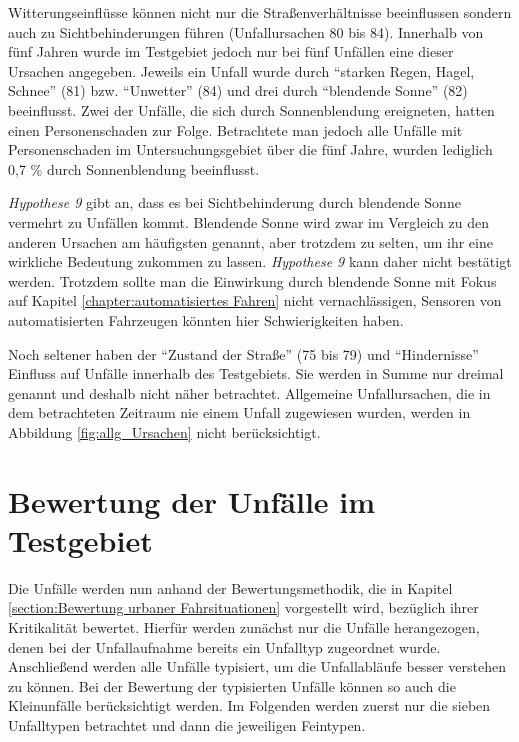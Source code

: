 Witterungseinflüsse können nicht nur die Straßenverhältnisse beeinflussen sondern auch zu Sichtbehinderungen führen (Unfallursachen 80 bis 84). Innerhalb von fünf Jahren wurde im Testgebiet jedoch nur bei fünf Unfällen eine dieser Ursachen angegeben. Jeweils ein Unfall wurde durch \enquote{starken Regen, Hagel, Schnee} (81) bzw. \enquote{Unwetter} (84) und drei durch \enquote{blendende Sonne} (82) beeinflusst. Zwei der Unfälle, die sich durch Sonnenblendung ereigneten, hatten einen Personenschaden zur Folge. Betrachtete man jedoch alle Unfälle mit Personenschaden im Untersuchungsgebiet über die fünf Jahre, wurden lediglich 0,7 \% durch Sonnenblendung beeinflusst.

\textit{Hypothese 9} gibt an, dass es bei Sichtbehinderung durch blendende Sonne vermehrt zu Unfällen kommt. Blendende Sonne wird zwar im Vergleich zu den anderen Ursachen am häufigsten genannt, aber trotzdem zu selten, um ihr eine wirkliche Bedeutung zukommen zu lassen. \textit{Hypothese 9} kann daher nicht bestätigt werden. Trotzdem sollte man die Einwirkung durch blendende Sonne mit Fokus auf Kapitel \ref{chapter:automatisiertes Fahren} nicht vernachlässigen, Sensoren von automatisierten Fahrzeugen könnten hier Schwierigkeiten haben.
 
Noch seltener haben der \enquote{Zustand der Straße} (75 bis 79) und \enquote{Hindernisse} Einfluss auf Unfälle innerhalb des Testgebiets. Sie werden in Summe nur dreimal genannt und deshalb nicht näher betrachtet. Allgemeine Unfallursachen, die in dem betrachteten Zeitraum nie einem Unfall zugewiesen wurden, werden in Abbildung \ref{fig:allg_Ursachen} nicht berücksichtigt.


\section{Bewertung der Unfälle im Testgebiet}\label{section:Bewertung der Unfälle im Testgebiet}
Die Unfälle werden nun anhand der Bewertungsmethodik, die in Kapitel \ref{section:Bewertung urbaner Fahrsituationen} vorgestellt wird, bezüglich ihrer Kritikalität bewertet. Hierfür werden zunächst nur die Unfälle herangezogen, denen bei der Unfallaufnahme bereits ein Unfalltyp zugeordnet wurde. Anschließend werden alle Unfälle typisiert, um die Unfallabläufe besser verstehen zu können. Bei der Bewertung der typisierten Unfälle können so auch die Kleinunfälle berücksichtigt werden. Im Folgenden werden zuerst nur die sieben Unfalltypen betrachtet und dann die jeweiligen Feintypen.

